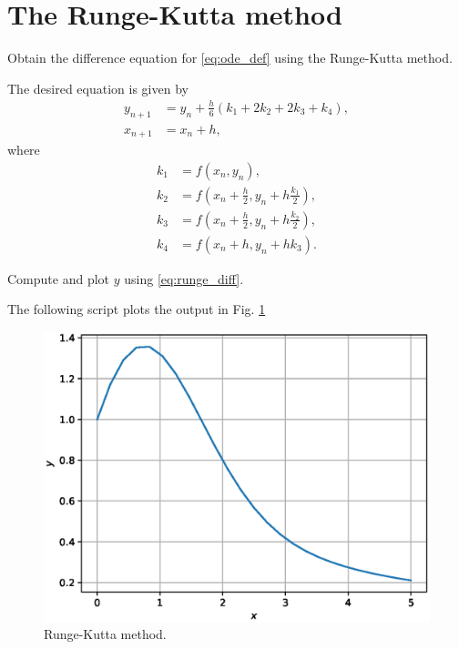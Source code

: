 \documentclass[journal,12pt,twocolumn]{IEEEtran}
\begin{document}
\section{The Runge-Kutta method}
\begin{problem}
Obtain the difference equation for \eqref{eq:ode_def} using the Runge-Kutta method. 
\end{problem}
\solution The desired equation is given by \cite{runge}
%
\begin{align}
\label{eq:runge_diff}
y_{n+1} &= y_{n}+{\tfrac {h}{6}}\left(k_{1}+2k_{2}+2k_{3}+k_{4}\right),
\\
x_{n+1} &= x_{n}+h,
\end{align}
%
where
\begin{align}
k_{1}&=f(x_{n},y_{n}),\\k_{2}&=f\left(x_{n}+{\frac {h}{2}},y_{n}+h{\frac {k_{1}}{2}}\right),\\k_{3}&=f\left(x_{n}+{\frac {h}{2}},y_{n}+h{\frac {k_{2}}{2}}\right),\\k_{4}&=f\left(x_{n}+h,y_{n}+hk_{3}\right).
\end{align}
%
\begin{problem}
Compute and plot $y$ using \eqref{eq:runge_diff}.
\end{problem}
\solution
 The following script plots the output in Fig. \ref{fig:runge}

\begin{figure}[!h]
\centering
\includegraphics[width=\columnwidth]{./figs/runge.eps}
\caption{Runge-Kutta method.}
\label{fig:runge}
\end{figure}
%

\end{document}
